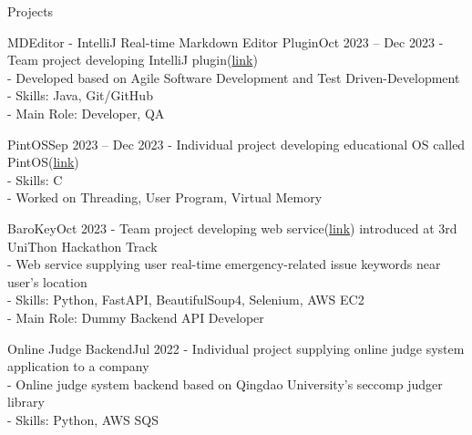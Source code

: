 \documentclass{resume}
\begin{document}
\begin{rSection}{Projects}
    \begin{rSubsection}{MDEditor - IntelliJ Real-time Markdown Editor Plugin}{Oct 2023 -- Dec 2023}
        - Team project developing IntelliJ plugin(\href{https://github.com/minsusun/csed332-project}{link}) \\
        - Developed based on Agile Software Development and Test Driven-Development \\
        - Skills: Java, Git/GitHub \\
        - Main Role: Developer, QA
    \end{rSubsection}
    
    \begin{rSubsection}{PintOS}{Sep 2023 -- Dec 2023}
        - Individual project developing educational OS called PintOS(\href{https://github.com/minsusun/csed312-pintos}{link}) \\
        - Skills: C \\
        - Worked on Threading, User Program, Virtual Memory
    \end{rSubsection}
    
    \begin{rSubsection}{BaroKey}{Oct 2023}
        - Team project developing web service(\href{https://github.com/UniD3-Hackathon-Team4/barokey}{link}) introduced at 3rd UniThon Hackathon Track \\
        - Web service supplying user real-time emergency-related issue keywords near user's location \\
        - Skills: Python, FastAPI, BeautifulSoup4, Selenium, AWS EC2 \\
        - Main Role: Dummy Backend API Developer
    \end{rSubsection}
    
    \begin{rSubsection}{Online Judge Backend}{Jul 2022}
        - Individual project supplying online judge system application to a company \\
        - Online judge system backend based on Qingdao University's seccomp judger library \\
        - Skills: Python, AWS SQS
    \end{rSubsection}
    
\end{rSection}
\end{document}

